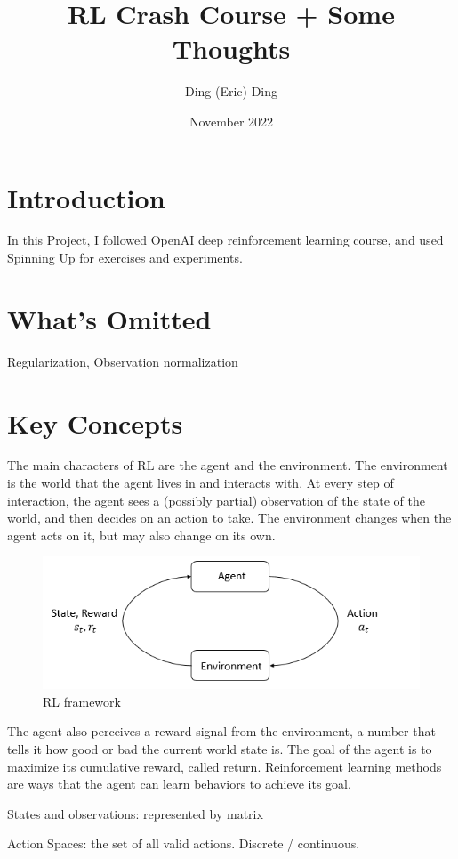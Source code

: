 \documentclass{article}
\title{RL Crash Course + Some Thoughts}
\author{Ding (Eric) Ding}
\date{November 2022}
\begin{document}
\maketitle

\section{Introduction}
    In this Project, I followed OpenAI deep reinforcement learning course, and used Spinning Up for exercises and experiments.

\section{What's Omitted}
    Regularization, Observation normalization

\section{Key Concepts}
    The main characters of RL are the agent and the environment. The environment is the world that the agent lives in and interacts with. At every step of interaction, the agent sees a (possibly partial) observation of the state of the world, and then decides on an action to take. The environment changes when the agent acts on it, but may also change on its own.
    \begin{figure}[H]
        \includegraphics[width=\linewidth]{rl_diagram_transparent_bg.png}
        \caption{RL framework}
        \label{fig:rl}
      \end{figure}

    The agent also perceives a reward signal from the environment, a number that tells it how good or bad the current world state is. The goal of the agent is to maximize its cumulative reward, called return. Reinforcement learning methods are ways that the agent can learn behaviors to achieve its goal.

    States and observations: represented by matrix

    Action Spaces: the set of all valid actions. Discrete / continuous.
\end{document}
